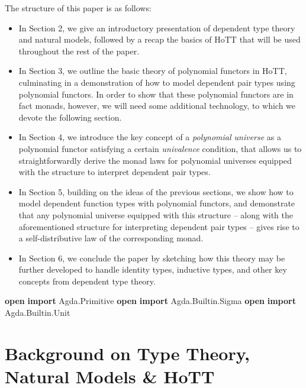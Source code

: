 \documentclass[
  11pt,
  oneside,
  article]{memoir}
\newenvironment{Shaded}{}{}
\newcommand{\KeywordTok}[1]{\textcolor[rgb]{0.00,0.44,0.13}{\textbf{#1}}}
\newcommand{\NormalTok}[1]{#1}
\newcommand{\OtherTok}[1]{\textcolor[rgb]{0.00,0.44,0.13}{#1}}
\providecommand{\tightlist}{%
  \setlength{\itemsep}{0pt}\setlength{\parskip}{0pt}}
\theoremstyle{definition}
\theoremstyle{plain}
\newcommand{\0}{\textsf{0}}
\newcommand{\1}{\tn{\textsf{1}}}
\begin{document}
The structure of this paper is as follows:

\begin{itemize}
\tightlist
\item
  In Section 2, we give an introductory presentation of dependent type
  theory and natural models, followed by a recap the basics of HoTT that
  will be used throughout the rest of the paper.
\item
  In Section 3, we outline the basic theory of polynomial functors in
  HoTT, culminating in a demonstration of how to model dependent pair
  types using polynomial functors. In order to show that these
  polynomial functors are in fact monads, however, we will need some
  additional technology, to which we devote the following section.
\item
  In Section 4, we introduce the key concept of a \emph{polynomial
  universe} as a polynomial functor satisfying a certain
  \emph{univalence} condition, that allows us to straightforwardly
  derive the monad laws for polynomial universes equipped with the
  structure to interpret dependent pair types.
\item
  In Section 5, building on the ideas of the previous sections, we show
  how to model dependent function types with polynomial functors, and
  demonstrate that any polynomial universe equipped with this structure
  -- along with the aforementioned structure for interpreting dependent
  pair types -- gives rise to a self-distributive law of the
  corresponding monad.
\item
  In Section 6, we conclude the paper by sketching how this theory may
  be further developed to handle identity types, inductive types, and
  other key concepts from dependent type theory.
\end{itemize}

\begin{Shaded}
\begin{Highlighting}[]
\KeywordTok{open} \KeywordTok{import}\NormalTok{ Agda}\OtherTok{.}\NormalTok{Primitive}
\KeywordTok{open} \KeywordTok{import}\NormalTok{ Agda}\OtherTok{.}\NormalTok{Builtin}\OtherTok{.}\NormalTok{Sigma}
\KeywordTok{open} \KeywordTok{import}\NormalTok{ Agda}\OtherTok{.}\NormalTok{Builtin}\OtherTok{.}\NormalTok{Unit}
\end{Highlighting}
\end{Shaded}

\chapter{Background on Type Theory, Natural Models \&
HoTT}\label{background-on-type-theory-natural-models-hott}
\end{document}
